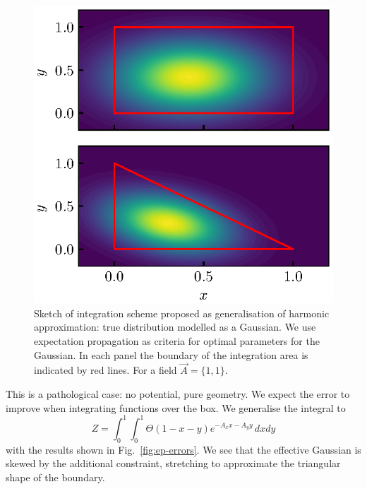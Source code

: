 \documentclass[11pt,twoside]{report}
\def\includebibliography{}
\begin{document}
\begin{figure}
  \includegraphics[width=0.9\linewidth,outer]{ep-pdf}
  \caption[Approximate probability distribution assumed in blah]{
    Sketch of integration scheme proposed as generalisation of harmonic approximation: true distribution modelled as a Gaussian.
    We use expectation propagation as criteria for optimal parameters for the Gaussian.
    In each panel the boundary of the integration area is indicated by red lines.
    For a field $\vec{A} = \{1,1\}$.}
\end{figure}

This is a pathological case: no potential, pure geometry.
We expect the error to improve when integrating functions over the box.
We generalise the integral to
\begin{equation}
  Z = \int_0^1 \int_0^1 \Theta(1 - x - y) e^{-A_x x - A_y y} \, dx dy
\end{equation}
with the results shown in Fig.\ \ref{fig:ep-errors}.
We see that the effective Gaussian is skewed by the additional constraint, stretching to approximate the triangular shape of the boundary.

\ifdefined\includebibliography
  \printbibliography
\fi
\end{document}
